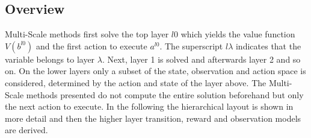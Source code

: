 \subsection{Overview} \label{subsec:Multi-Scale_overview}
Multi-Scale methods first solve the top layer $l0$ which yields the value function $V(b^{l0})$ and the first action to execute $a^{l0}$. The superscript $l\lambda$ indicates that the variable belongs to layer $\lambda$. Next, layer 1 is solved and afterwards layer 2 and so on. On the lower layers only a subset of the state, observation and action space is considered, determined by the action and state of the layer above. The Multi-Scale methods presented do not compute the entire solution beforehand but only the next action to execute. In the following the hierarchical layout is shown in more detail and then the higher layer transition, reward and observation models are derived.

